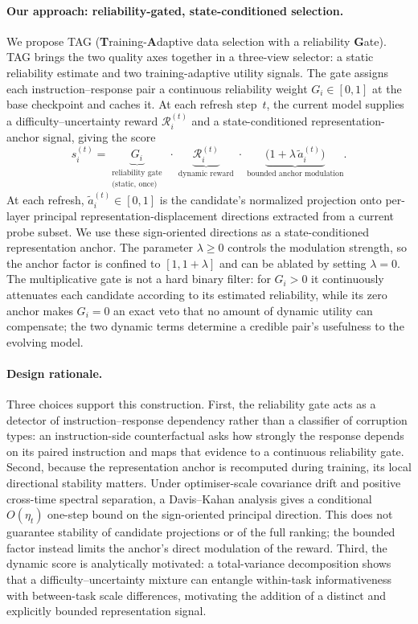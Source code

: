 \paragraph{Our approach: reliability-gated, state-conditioned
selection.}
We propose \textsc{TAG} (\textbf{T}raining-\textbf{A}daptive data
selection with a reliability \textbf{G}ate). \textsc{TAG} brings the
two quality axes together in a three-view selector: a static
reliability estimate and two training-adaptive utility signals. The
gate assigns each instruction--response pair a continuous reliability
weight \(G_i\in[0,1]\) at the base checkpoint and caches it. At each
refresh step~\(t\), the current model supplies a
difficulty--uncertainty reward \(\mathcal R_i^{(t)}\) and a
state-conditioned representation-anchor signal, giving the score
\begin{equation}
s_i^{(t)}
=
\underbrace{G_i}_{\substack{\text{reliability gate}\\ \text{(static, once)}}}
\;\cdot\;
\underbrace{\mathcal{R}_i^{(t)}}_{\text{dynamic reward}}
\;\cdot\;
\underbrace{\bigl(1+\lambda\,\widetilde a_i^{(t)}\bigr)}_{\text{bounded anchor modulation}}.
\label{eq:tag-score}
\end{equation}
At each refresh, \(\widetilde a_i^{(t)}\in[0,1]\) is the
candidate's normalized projection onto per-layer principal
representation-displacement directions extracted from a current
probe subset. We use these sign-oriented directions as a
state-conditioned representation anchor. The parameter
\(\lambda\ge0\) controls the modulation strength, so the anchor
factor is confined to \([1,1+\lambda]\) and can be ablated by
setting \(\lambda=0\). The multiplicative gate is not a hard binary
filter: for \(G_i>0\) it continuously attenuates each candidate
according to its estimated reliability, while its zero anchor makes
\(G_i=0\) an exact veto that no amount of dynamic utility can
compensate; the two dynamic terms determine a credible pair's
usefulness to the evolving model.

\paragraph{Design rationale.}
Three choices support this construction. First, the reliability gate
acts as a detector of instruction--response dependency rather than a
classifier of corruption types: an instruction-side counterfactual
asks how strongly the response depends on its paired instruction and
maps that evidence to a continuous reliability gate. Second,
because the representation anchor is recomputed during training, its
local directional stability matters. Under optimiser-scale covariance
drift and positive cross-time spectral separation, a Davis--Kahan
analysis gives a conditional \(O(\eta_t)\) one-step bound on the
sign-oriented principal direction. This does not guarantee stability
of candidate projections or of the full ranking; the bounded factor
instead limits the anchor's direct modulation of the reward. Third,
the dynamic score is
analytically motivated: a total-variance decomposition shows that a
difficulty--uncertainty mixture can entangle within-task
informativeness with between-task scale differences, motivating the
addition of a distinct and explicitly bounded representation signal.


